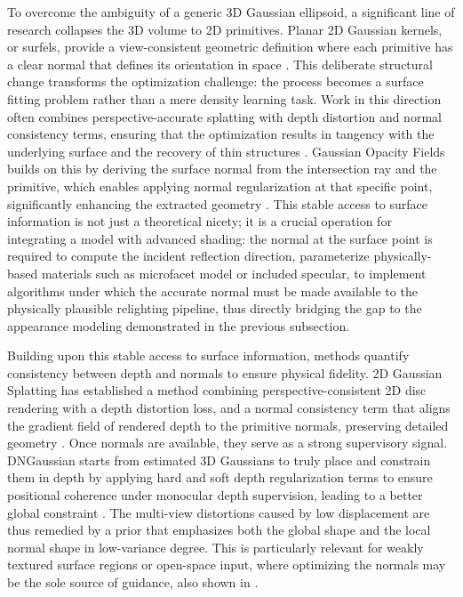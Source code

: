 \documentclass[11pt,a4paper]{article}
\begin{document}
To overcome the ambiguity of a generic 3D Gaussian ellipsoid, a significant line of research collapses the 3D volume to 2D primitives. Planar 2D Gaussian kernels, or surfels, provide a view-consistent geometric definition where each primitive has a clear normal that defines its orientation in space \cite{arxiv:2403.17888v1}. This deliberate structural change transforms the optimization challenge: the process becomes a surface fitting problem rather than a mere density learning task. Work in this direction often combines perspective-accurate splatting with depth distortion and normal consistency terms, ensuring that the optimization results in tangency with the underlying surface and the recovery of thin structures \cite{arxiv:2403.17888v1}. Gaussian Opacity Fields builds on this by deriving the surface normal from the intersection ray and the primitive, which enables applying normal regularization at that specific point, significantly enhancing the extracted geometry \cite{arxiv:2404.10772v1}. This stable access to surface information is not just a theoretical nicety; it is a crucial operation for integrating a model with advanced shading: the normal at the surface point is required to compute the incident reflection direction, parameterize physically-based materials such as microfacet model or included specular, to implement algorithms under which the accurate normal must be made available to the physically plausible relighting pipeline, thus directly bridging the gap to the appearance modeling demonstrated in the previous subsection.

Building upon this stable access to surface information, methods quantify consistency between depth and normals to ensure physical fidelity. 2D Gaussian Splatting has established a method combining perspective-consistent 2D disc rendering with a depth distortion loss, and a normal consistency term that aligns the gradient field of rendered depth to the primitive normals, preserving detailed geometry \cite{arxiv:2403.17888v1}. Once normals are available, they serve as a strong supervisory signal. DNGaussian starts from estimated 3D Gaussians to truly place and constrain them in depth by applying hard and soft depth regularization terms to ensure positional coherence under monocular depth supervision, leading to a better global constraint \cite{arxiv:2403.06912v3}. The multi-view distortions caused by low displacement are thus remedied by a prior that emphasizes both the global shape and the local normal shape in low-variance degree. This is particularly relevant for weakly textured surface regions or open-space input, where optimizing the normals may be the sole source of guidance, also shown in \cite{arxiv:2404.00409v1}.
\end{document}
